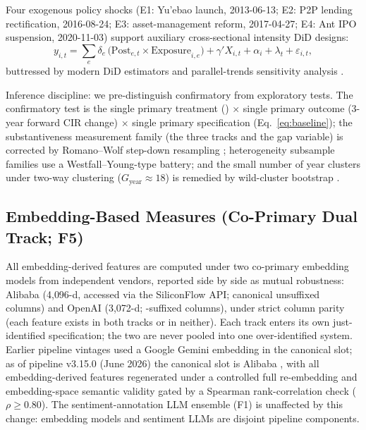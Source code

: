 Four exogenous policy shocks (E1: Yu'ebao launch, 2013-06-13; E2: P2P lending
rectification, 2016-08-24; E3: asset-management reform, 2017-04-27; E4: Ant
IPO suspension, 2020-11-03) support auxiliary cross-sectional intensity DiD
designs:
\begin{equation}
y_{i,t} = \sum_{e}\delta_e\,
 \bigl(\mathrm{Post}_{e,t}\times \mathrm{Exposure}_{i,e}\bigr)
 + \gamma' X_{i,t} + \alpha_i + \lambda_t + \varepsilon_{i,t},
\label{eq:did}
\end{equation}
buttressed by modern DiD estimators and parallel-trends sensitivity analysis
\parencite{callaway2021difference,rambachan2023more}.

Inference discipline: we pre-distinguish confirmatory from exploratory tests.
The confirmatory test is the single primary treatment ()
$\times$ single primary outcome (3-year forward CIR change) $\times$ single
primary specification (Eq.~\eqref{eq:baseline}); the substantiveness
measurement family (the three  tracks and the gap variable)
is corrected by Romano--Wolf step-down resampling
\parencite{romanowolf2005stepwise}; heterogeneity subsample families use a
Westfall--Young-type battery; and the small number of year clusters under
two-way clustering ($G_{\text{year}}\approx18$) is remedied by wild-cluster
bootstrap \parencite{roodman2019boottest}.

\subsection{Embedding-Based Measures (Co-Primary Dual Track; F5)}
All embedding-derived features are computed under two co-primary
embedding models from independent vendors, reported side by side as
mutual robustness: Alibaba  (4{,}096-d,
accessed via the SiliconFlow API; canonical unsuffixed columns) and
OpenAI  (3{,}072-d; -suffixed
columns), under strict column parity (each feature exists in both
tracks or in neither). Each track enters its own just-identified
specification; the two are never pooled into one over-identified
system. Earlier pipeline vintages used a Google Gemini embedding in
the canonical slot; as of pipeline v3.15.0 (June 2026) the canonical
slot is Alibaba , with all embedding-derived
features regenerated under a controlled full re-embedding and
embedding-space semantic validity gated by a Spearman
rank-correlation check ($\rho \geq 0.80$). The sentiment-annotation
LLM ensemble (F1) is unaffected by this change: embedding models and
sentiment LLMs are disjoint pipeline components.

